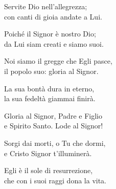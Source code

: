 

\spazio

\strofa Servite Dio nell'allegrezza;\\
con canti di gioia andate a Lui.

\spazio


\spazio

\strofa Poiché il Signor è nostro Dio;\\
da Lui siam creati e siamo suoi.

\spazio


\spazio

\strofa Noi siamo il gregge che Egli pasce,\\
il popolo suo: gloria al Signor.

\spazio


\spazio

\strofa La sua bontà dura in eterno,\\
la sua fedeltà giammai finirà.

\spazio


\spazio

\strofa Gloria al Signor, Padre e Figlio\\
e Spirito Santo. Lode al Signor!

\spazio


\spazio

\strofa Sorgi dai morti, o Tu che dormi,\\
e Cristo Signor t'illuminerà.

\spazio


\spazio

\strofa Egli è il sole di resurrezione,\\
che con i suoi raggi dona la vita.

\spazio

